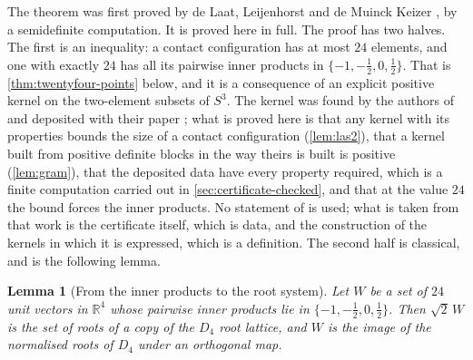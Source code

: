 \documentclass[11pt,reqno]{amsart}
\renewcommand{\_}{\origunderscore\allowbreak}
\numberwithin{equation}{section}
\theoremstyle{plain}
\newtheorem{lem}[thm]{Lemma}
\theoremstyle{definition}
\theoremstyle{remark}
\begin{document}
The theorem was first proved by de Laat, Leijenhorst and de Muinck Keizer
\cite[Thm.~5.3]{LLM24}, by a semidefinite computation. It is proved here in
full. The proof has two halves. The first is an inequality: a contact
configuration has at most $24$ elements, and one with exactly $24$ has all
its pairwise inner products in $\{-1,-\tfrac12,0,\tfrac12\}$. That is
\cref{thm:twentyfour-points} below, and it is a consequence of an explicit
positive kernel on the two-element subsets of $S^3$. The kernel was found by
the authors of \cite{LLM24} and deposited with their paper
\cite{LLM24data}; what is proved here is that any kernel with its
properties bounds the size of a contact configuration
(\cref{lem:las2}), that a kernel built from positive definite blocks in the
way theirs is built is positive (\cref{lem:gram}), that the deposited data
have every property required, which is a finite computation carried out in
\cref{sec:certificate-checked}, and that at the value $24$ the bound
forces the inner products. No statement of \cite{LLM24} is used; what is
taken from that work is the certificate itself, which is data, and the
construction of the kernels in which it is expressed, which is a
definition. The second half is classical, and is the following lemma.

\begin{lem}[From the inner products to the root system]\label{lem:root-lattice}
Let $W$ be a set of $24$ unit vectors in $\mathbb{R}^4$ whose pairwise
inner products lie in $\{-1,-\tfrac12,0,\tfrac12\}$. Then $\sqrt2\,W$ is
the set of roots of a copy of the $D_4$ root lattice, and $W$ is the
image of the normalised roots of $D_4$ under an orthogonal map.
\end{lem}
\end{document}
